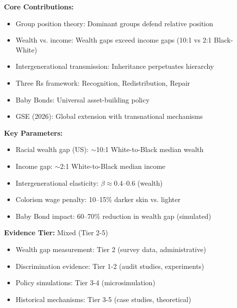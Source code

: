 \begin{tcolorbox}[colback=gray!5!white,colframe=gray!75!black,title=Quick Reference]
\textbf{Core Contributions:}
\begin{itemize}
    \item Group position theory: Dominant groups defend relative position
    \item Wealth vs. income: Wealth gaps exceed income gaps (10:1 vs 2:1 Black-White)
    \item Intergenerational transmission: Inheritance perpetuates hierarchy
    \item Three Rs framework: Recognition, Redistribution, Repair
    \item Baby Bonds: Universal asset-building policy
    \item GSE (2026): Global extension with transnational mechanisms
\end{itemize}

\textbf{Key Parameters:}
\begin{itemize}
    \item Racial wealth gap (US): $\sim$10:1 White-to-Black median wealth
    \item Income gap: $\sim$2:1 White-to-Black median income
    \item Intergenerational elasticity: $\beta \approx 0.4$--$0.6$ (wealth)
    \item Colorism wage penalty: 10--15\% darker skin vs. lighter
    \item Baby Bond impact: 60--70\% reduction in wealth gap (simulated)
\end{itemize}

\textbf{Evidence Tier:} Mixed (Tier 2-5)
\begin{itemize}
    \item Wealth gap measurement: Tier 2 (survey data, administrative)
    \item Discrimination evidence: Tier 1-2 (audit studies, experiments)
    \item Policy simulations: Tier 3-4 (microsimulation)
    \item Historical mechanisms: Tier 3-5 (case studies, theoretical)
\end{itemize}
\end{tcolorbox}


